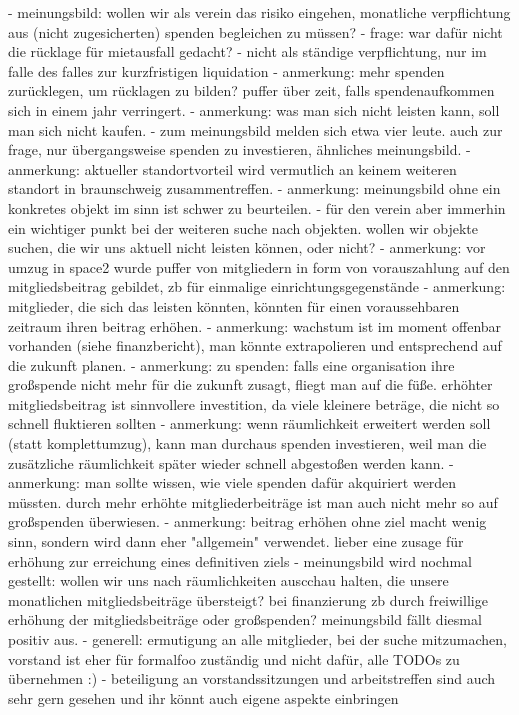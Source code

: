 \documentclass{s0minutes}
\begin{document}
- meinungsbild: wollen wir als verein das risiko eingehen, monatliche
  verpflichtung aus (nicht zugesicherten) spenden begleichen zu müssen?
  - frage: war dafür nicht die rücklage für mietausfall gedacht?
    - nicht als ständige verpflichtung, nur im falle des falles zur kurzfristigen liquidation
    - anmerkung: mehr spenden zurücklegen, um rücklagen zu bilden? puffer über
      zeit, falls spendenaufkommen sich in einem jahr verringert.
    - anmerkung: was man sich nicht leisten kann, soll man sich nicht kaufen.
    - zum meinungsbild melden sich etwa vier leute. auch zur frage, nur
      übergangsweise spenden zu investieren, ähnliches meinungsbild.
  - anmerkung: aktueller standortvorteil wird vermutlich an keinem weiteren
    standort in braunschweig zusammentreffen.
  - anmerkung: meinungsbild ohne ein konkretes objekt im sinn ist schwer zu beurteilen.
    - für den verein aber immerhin ein wichtiger punkt bei der weiteren suche
      nach objekten. wollen wir objekte suchen, die wir uns aktuell nicht leisten
      können, oder nicht?
  - anmerkung: vor umzug in space2 wurde puffer von mitgliedern in form von
    vorauszahlung auf den mitgliedsbeitrag gebildet, zb für einmalige
    einrichtungsgegenstände
  - anmerkung: mitglieder, die sich das leisten könnten, könnten für einen
    voraussehbaren zeitraum ihren beitrag erhöhen.
  - anmerkung: wachstum ist im moment offenbar vorhanden (siehe finanzbericht),
    man könnte extrapolieren und entsprechend auf die zukunft planen.
  - anmerkung: zu spenden: falls eine organisation ihre großspende nicht mehr
    für die zukunft zusagt, fliegt man auf die füße. erhöhter mitgliedsbeitrag ist
    sinnvollere investition, da viele kleinere beträge, die nicht so schnell
    fluktieren sollten
  - anmerkung: wenn räumlichkeit erweitert werden soll (statt komplettumzug),
    kann man durchaus spenden investieren, weil man die zusätzliche räumlichkeit
    später wieder schnell abgestoßen werden kann.
  - anmerkung: man sollte wissen, wie viele spenden dafür akquiriert werden
    müssten. durch mehr erhöhte mitgliederbeiträge ist man auch nicht mehr so auf
    großspenden überwiesen.
  - anmerkung: beitrag erhöhen ohne ziel macht wenig sinn, sondern wird dann
    eher "allgemein" verwendet. lieber eine zusage für erhöhung zur erreichung
    eines definitiven ziels
  - meinungsbild wird nochmal gestellt: wollen wir uns nach räumlichkeiten
    auscchau halten, die unsere monatlichen mitgliedsbeiträge übersteigt? bei
    finanzierung zb durch freiwillige erhöhung der mitgliedsbeiträge oder
    großspenden? meinungsbild fällt diesmal positiv aus.
- generell: ermutigung an alle mitglieder, bei der suche mitzumachen, vorstand
  ist eher für formalfoo zuständig und nicht dafür, alle TODOs zu übernehmen :)
  - beteiligung an vorstandssitzungen und arbeitstreffen sind auch sehr gern
    gesehen und ihr könnt auch eigene aspekte einbringen
\end{document}
